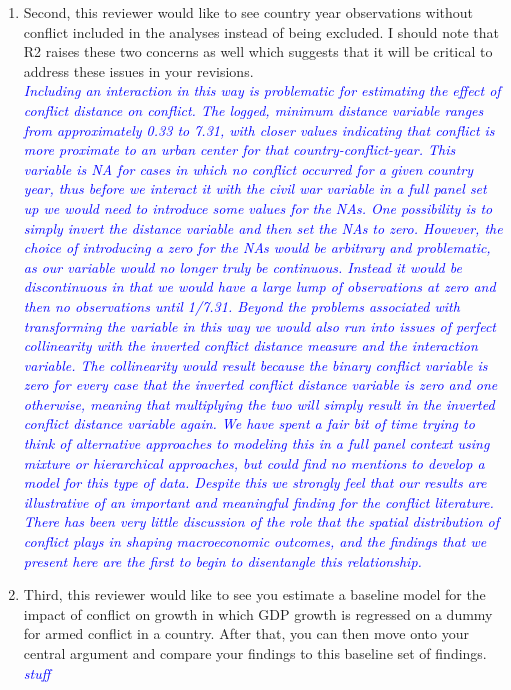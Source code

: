 \begin{enumerate}
\item Second, this reviewer would like to see country year observations without conflict included in the analyses instead of being excluded. I should note that R2 raises these two concerns as well which suggests that it will be critical to address these issues in your revisions. \\

\textcolor{blue}{\emph{
	Including an interaction in this way is problematic for estimating the effect of conflict distance on conflict. The logged, minimum distance variable ranges from approximately 0.33 to 7.31, with closer values indicating that conflict is more proximate to an urban center for that country-conflict-year. This variable is NA for cases in which no conflict occurred for a given country year, thus before we interact it with the civil war variable in a full panel set up we would need to introduce some values for the NAs. One possibility is to simply invert the distance variable and then set the NAs to zero. However, the choice of introducing a zero for the NAs would be arbitrary and problematic, as our variable would no longer truly be continuous. Instead it would be discontinuous in that we would have a large lump of observations at zero and then no observations until 1/7.31. Beyond the problems associated with transforming the variable in this way we would also run into issues of perfect collinearity with the inverted conflict distance measure and the interaction variable. The collinearity would result because the binary conflict variable is zero for every case that the inverted conflict distance variable is zero and one otherwise, meaning that multiplying the two will simply result in the inverted conflict distance variable again. 
	We have spent a fair bit of time trying to think of alternative approaches to modeling this in a full panel context using mixture or hierarchical approaches, but could find no mentions to develop a model for this type of data. 
	Despite this we strongly feel that our results are illustrative of an important and meaningful finding for the conflict literature. There has been very little discussion of the role that the spatial distribution of conflict plays in shaping macroeconomic outcomes, and the findings that we present here are the first to begin to disentangle this relationship.
}}

\item Third, this reviewer would like to see you estimate a baseline model for the impact of conflict on growth in which GDP growth is regressed on a dummy for armed conflict in a country. After that, you can then move onto your central argument and compare your findings to this baseline set of findings. \\

\textcolor{blue}{\emph{
	stuff
}}

\end{enumerate}

